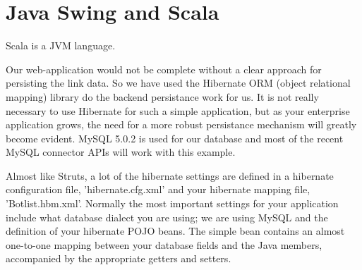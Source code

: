 \section{Java Swing and Scala}

Scala is a JVM language.

Our web-application would not be complete without a clear approach 
for persisting the link data. So we have used the Hibernate ORM 
(object relational mapping) library do the backend persistance work for us. 
It is not really necessary to use Hibernate for such a simple 
application, but as your enterprise application grows, 
the need for a more robust persistance mechanism will greatly become evident. 
MySQL 5.0.2 is used for our database and most of the recent 
MySQL connector APIs will work with this example.

Almost like Struts, a lot of the hibernate settings 
are defined in a hibernate configuration file, 'hibernate.cfg.xml' 
and your hibernate mapping file, 'Botlist.hbm.xml'. 
Normally the most important settings for your application 
include what database dialect you are using; we are using MySQL 
and the definition of your hibernate POJO beans. 
The simple bean contains an almost one-to-one mapping between 
your database fields and the Java members, accompanied by 
the appropriate getters and setters.